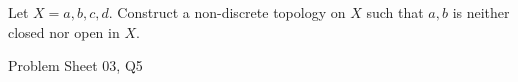 \begin{samepage}
\begin{ex}
Let $X = {{a, b, c, d }}$. Construct a non-discrete topology on $X$ such that ${{ a, b }}$ is neither closed nor open in $X$.
\end{ex}
\begin{source}
Problem Sheet 03, Q5
\end{source}
\end{samepage}
